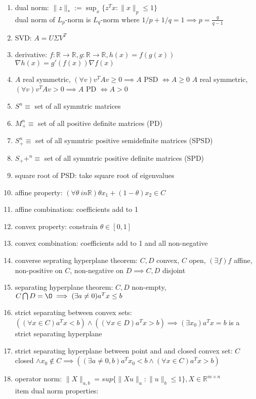 \documentclass[12pt,letter]{article}
\newcommand{\R}{\mathbb{R}}
\newcommand{\norm}[1]{\|#1\|}
\begin{document}

\begin{enumerate}
\item dual norm: $\|z\|_* := \sup_x \{z^T x : \|x\|_p \leq 1\}$ \\
  dual norm of $L_p$-norm is $L_q$-norm where $1/p + 1/q = 1 \implies p = \frac{q}{q-1}$
\item SVD: $A=U\Sigma V^T$
\item derivative: $f: \R \to \R, g: \R \to \R, h(x) = f(g(x))$
  $\nabla h(x) = g'(f(x))  \nabla f(x)$
\item $A$ real symmetric, $(\forall v) v^TAv \geq 0 \implies A$ PSD $\iff A \geq 0$
  $A$ real symmetric, $(\forall v) v^TAv > 0 \implies A$ PD $\iff A > 0$
\item $S^n \equiv$ set of all symmtric matrices
\item $M_+^n \equiv$ set of all positive definite matrices (PD)
\item $S_+^n \equiv$ set of all symmtric positive semidefinite matrices (SPSD)
\item $S_++^n \equiv$ set of all symmtric positive definite matrices (SPD)
\item square root of PSD: take square root of eigenvalues
\item affine property: $(\forall \theta \ in \R) \theta x_1 + (1-\theta)x_2 \in C$
\item affine combination: coefficients add to 1
\item convex property: constrain $\theta \in [0,1]$
\item convex combination: coefficients add to 1 and all non-negative
\item converse seprating hyperplane theorem: $C,D$ convex, $C$ open, $(\exists f)f$ affine, non-positive on $C$, non-negative on $D \implies C, D$ disjoint
\item separating hyperplane theorem: $C,D$ non-empty, $C \bigcap D = \O \implies (\exists a\neq 0) a^Tx \leq b$
\item strict separating between convex sets: $((\forall x \in C)a^Tx < b) \wedge ((\forall x \in D)a^Tx > b) \implies (\exists x_0) a^Tx = b$ is a strict separating hyperplane
\item strict separating hyperplane between point and and closed convex set: $C$ closed $\wedge x_0 \not\in C \implies ((\exists a\neq 0,b) a^Tx_0 < b \wedge (\forall x \in C)a^Tx > b)$
\item operator norm: $\norm{X}_{a,b}=sup\{\norm{Xu}_a : \norm{u}_b \leq 1 \}, X \in \R^{m\times n}$\\item dual norm properties:

\end{enumerate}
\end{document}
